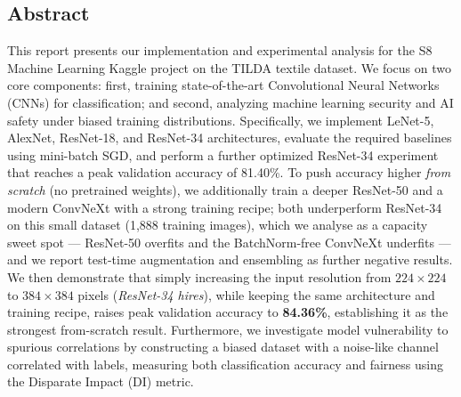 \documentclass{name}
\newcounter{pagezero}
\begin{document}


\enseignant{}

\fairemarges %
\fairepagedegarde %

\newpage
\setcounter{pagezero}{0}

\begin{center}
	\begin{minipage}{13cm}
	    \begin{center}
	        \section*{Abstract}
	    \end{center}
	    This report presents our implementation and experimental analysis for the S8 Machine Learning Kaggle project on the TILDA textile dataset.
	    We focus on two core components: first, training state-of-the-art Convolutional Neural Networks (CNNs) for classification; and second, analyzing machine learning security and AI safety under biased training distributions.
	    Specifically, we implement LeNet-5, AlexNet, ResNet-18, and ResNet-34 architectures, evaluate the required baselines using mini-batch SGD, and perform a further optimized ResNet-34 experiment that reaches a peak validation accuracy of 81.40\%. To push accuracy higher \emph{from scratch} (no pretrained weights), we additionally train a deeper ResNet-50 and a modern ConvNeXt with a strong training recipe; both underperform ResNet-34 on this small dataset (1,888 training images), which we analyse as a capacity sweet spot --- ResNet-50 overfits and the BatchNorm-free ConvNeXt underfits --- and we report test-time augmentation and ensembling as further negative results. We then demonstrate that simply increasing the input resolution from $224\times224$ to $384\times384$ pixels (\emph{ResNet-34 hires}), while keeping the same architecture and training recipe, raises peak validation accuracy to \textbf{84.36\%}, establishing it as the strongest from-scratch result.
	    Furthermore, we investigate model vulnerability to spurious correlations by constructing a biased dataset with a noise-like channel correlated with labels, measuring both classification accuracy and fairness using the Disparate Impact (DI) metric.
	\end{minipage}
\end{center}
\end{document}
